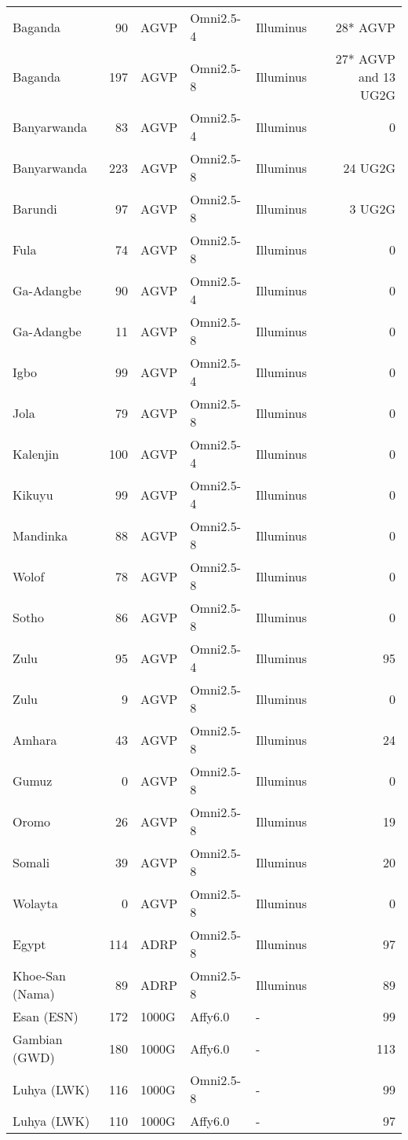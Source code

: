 \begin{table}[htp]
{\begin{tabular}{lrlllr}
Baganda & 90 & AGVP & Omni2.5-4 & Illuminus & 28* AGVP \\
Baganda & 197 & AGVP & Omni2.5-8 & Illuminus & 27* AGVP and 13 UG2G \\
Banyarwanda & 83 & AGVP & Omni2.5-4 & Illuminus & 0 \\
Banyarwanda & 223 & AGVP & Omni2.5-8 & Illuminus & 24 UG2G \\
Barundi & 97 & AGVP & Omni2.5-8 & Illuminus & 3 UG2G \\
Fula & 74 & AGVP & Omni2.5-8 & Illuminus & 0 \\
Ga-Adangbe & 90 & AGVP & Omni2.5-4 & Illuminus & 0 \\
Ga-Adangbe & 11 & AGVP & Omni2.5-8 & Illuminus & 0 \\
Igbo & 99 & AGVP & Omni2.5-4 & Illuminus & 0 \\
Jola & 79 & AGVP & Omni2.5-8 & Illuminus & 0 \\
Kalenjin & 100 & AGVP & Omni2.5-4 & Illuminus & 0 \\
Kikuyu & 99 & AGVP & Omni2.5-4 & Illuminus & 0 \\
Mandinka & 88 & AGVP & Omni2.5-8 & Illuminus & 0 \\
Wolof & 78 & AGVP & Omni2.5-8 & Illuminus & 0 \\
Sotho & 86 & AGVP & Omni2.5-8 & Illuminus & 0 \\
Zulu & 95 & AGVP & Omni2.5-4 & Illuminus & 95 \\
Zulu & 9 & AGVP & Omni2.5-8 & Illuminus & 0 \\
Amhara & 43 & AGVP & Omni2.5-8 & Illuminus & 24 \\
Gumuz & 0 & AGVP & Omni2.5-8 & Illuminus & 0 \\
Oromo & 26 & AGVP & Omni2.5-8 & Illuminus & 19 \\
Somali & 39 & AGVP & Omni2.5-8 & Illuminus & 20 \\
Wolayta & 0 & AGVP & Omni2.5-8 & Illuminus & 0 \\
Egypt & 114 & ADRP & Omni2.5-8 & Illuminus & 97 \\
Khoe-San (Nama) & 89 & ADRP & Omni2.5-8 & Illuminus & 89 \\

Esan (ESN) & 172 & 1000G & Affy6.0 & - & 99  \\

Gambian (GWD) & 180 & 1000G & Affy6.0 & - & 113  \\

Luhya (LWK) & 116 & 1000G & Omni2.5-8 & - & 99 \\
Luhya (LWK) & 110 & 1000G & Affy6.0 & - & 97  \\


\end{tabular}}
\end{table}
